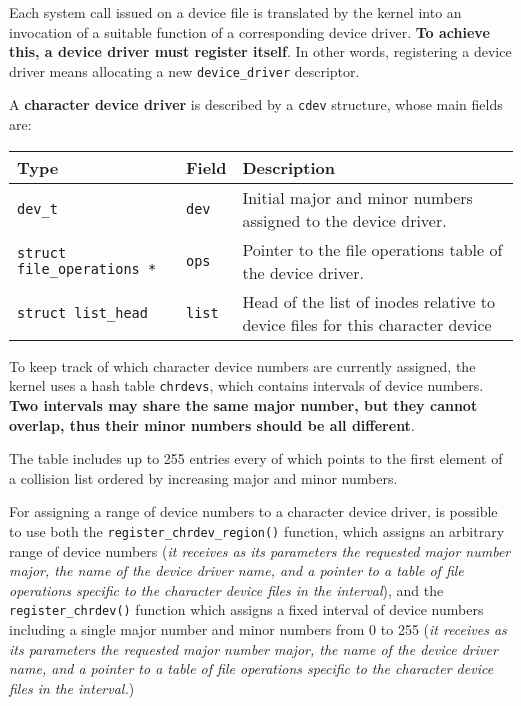 \documentclass[10pt,a4paper]{article}
\begin{document}
Each system call issued on a device file is translated by the kernel into an invocation of a suitable function of a corresponding device driver. \textbf{To achieve this, a device driver must register itself}. In other words, registering a device driver means allocating a new \texttt{device\_driver} descriptor.

A \textbf{character device driver} is described by a \texttt{cdev} structure, whose main fields are:

\begin{center}
\begin{tabular}{l|l|p{13cm}} 

\toprule
Type & Field & Description \\
\midrule


\texttt{dev\_t} & \texttt{dev} & Initial major and minor numbers assigned to the device driver.

\\ 
\texttt{struct file\_operations *} & \texttt{ops} & Pointer to the file operations table of the device driver.

\\
\texttt{struct list\_head} & \texttt{list} & Head of the list of inodes relative to device files for this character device

\\
\bottomrule
\end{tabular}
\end{center}

To keep track of which character device numbers are currently assigned, the kernel uses a hash table \texttt{chrdevs}, which contains intervals of device numbers. \textbf{Two intervals may share the same major number, but they cannot overlap, thus their minor numbers should be all different}.

The table includes up to 255 entries every of which points to the first element of a collision list ordered by increasing major and minor numbers.

For assigning a range of device numbers to a character device driver, is possible to use both the \texttt{register\_chrdev\_region()} function, which assigns an arbitrary range of device numbers (\textit{it receives as its parameters the requested major number major, the name of the device driver name, and a pointer to a table of file operations specific to the character device files in the interval}), and the \texttt{register\_chrdev()} function which assigns a fixed interval of device numbers including a single major number and minor numbers from 0 to 255 (\textit{it receives as its parameters the requested major number major, the name of the device driver name, and a pointer to a table of file operations specific to the character device files in the interval.})
\end{document}
